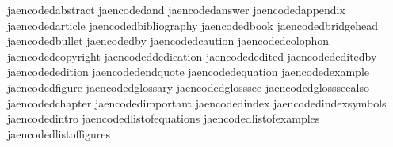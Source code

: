    jaencodedabstract              {}
   jaencodedand                   {}
   jaencodedanswer                {}
   jaencodedappendix              {}
   jaencodedarticle               {}
   jaencodedbibliography          {}
   jaencodedbook                  {}
   jaencodedbridgehead            {}
   jaencodedbullet                {}
   jaencodedby                    {}
   jaencodedcaution               {}
   jaencodedcolophon              {}
   jaencodedcopyright             {}
   jaencodeddedication            {}
   jaencodededited                {}
   jaencodededitedby              {}
   jaencodededition               {}
   jaencodedendquote              {}
   jaencodedequation              {}
   jaencodedexample               {}
   jaencodedfigure                {}
   jaencodedglossary              {}
   jaencodedglosssee              {}
   jaencodedglossseealso          {}
   jaencodedchapter               {}
   jaencodedimportant             {}
   jaencodedindex                 {}
   jaencodedindexsymbols          {}
   jaencodedintro                 {}
   jaencodedlistofequations       {}
   jaencodedlistofexamples        {}
   jaencodedlistoffigures         {}
